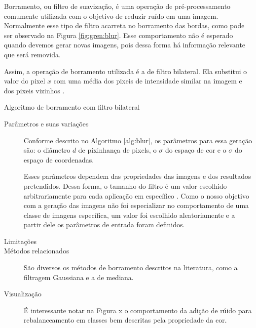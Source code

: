 Borramento, ou filtro de suavização, é uma operação de pré-processamento
comumente utilizada com o objetivo de reduzir ruído em uma imagem. Normalmente
esse tipo de filtro acarreta no borramento das bordas, como pode ser observado na
Figura \ref{fig:gren:blur}. Esse comportamento não é esperado quando devemos gerar novas imagens,
pois dessa forma há informação relevante que será removida.

Assim, a operação de borramento utilizada é a de filtro bilateral. Ela substitui
o valor do pixel $x$ com uma média dos pixeis de intensidade similar na imagem e dos pixeis
vizinhos \cite{Tomasi1998}.

\vspace{0.5cm}
\begin{algorithm}[H]
  \caption{Algoritmo de borramento com filtro bilateral}
  \label{alg:blur}
  \SetAlgoLined


\end{algorithm}
\vspace{0.5cm}

\begin{description}
  \item[Parâmetros e suas variações] Conforme descrito no Algoritmo \ref{alg:blur},
os parâmetros para essa geração são: o diâmetro $d$ de pixinhança de pixels, o
$\sigma$ do espaço de cor e o $\sigma$ do espaço de coordenadas.

Esses parâmetros dependem das propriedades das imagens e dos resultados pretendidos.
Dessa forma, o tamanho do filtro é um valor escolhido arbitrariamente para cada
aplicação em específico \cite{Tomasi1998}. Como o nosso objetivo com a geração das
imagens não foi especializar no comportamento de uma classe de imagens específica,
um valor foi escolhido aleatoriamente e a partir dele os parâmetros de entrada
foram definidos.

\item[Limitações]

\item[Métodos relacionados]
São diversos os métodos de borramento descritos na literatura, como a filtragem
Gaussiana e a de mediana.

\item[Visualização]
É interessante notar na Figura x o comportamento da adição de rúido para rebalanceamento
em classes bem descritas pela propriedade da cor.


\end{description}
